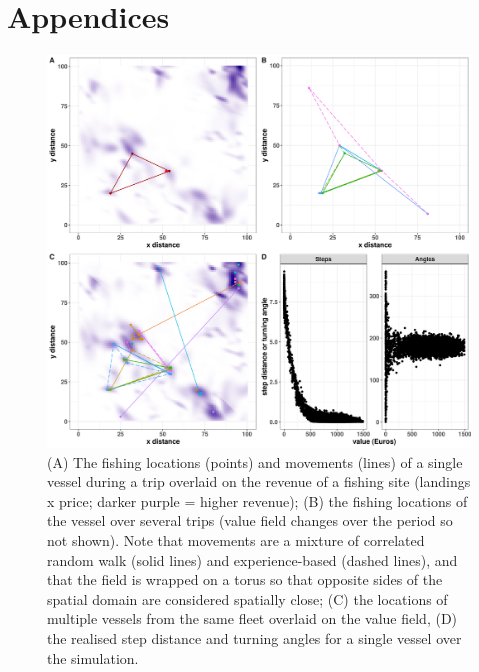 \documentclass[review]{elsarticle}
\begin{document}
\section*{Appendices}



\clearpage


\clearpage




\clearpage


\begin{figure}[!ht]
	\includegraphics[width = \linewidth]{Plots/Combined_Movement}
	\caption{(A) The fishing locations (points) and movements (lines) of a
		single vessel during a trip overlaid on the revenue of a
		fishing site (landings x price; darker purple = higher
		revenue); (B) the fishing locations of the vessel over several
		trips (value field changes over the period so not shown). Note
		that movements are a mixture of correlated random walk (solid
		lines) and experience-based (dashed lines), and that the field
		is wrapped on a torus so that opposite sides of the spatial
		domain are considered spatially close; (C) the locations of
		multiple vessels from the same fleet overlaid on the value
		field, (D) the realised step distance and turning angles for a
		single vessel over the simulation.}
	\label{fig:mv}
\end{figure}	
\end{document}
